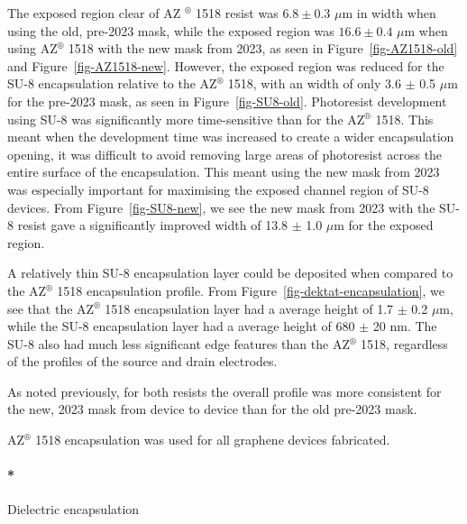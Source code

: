 \documentclass[
  letterpaper,
  DIV=11,
  numbers=noendperiod]{scrartcl}
\let\oldparagraph\paragraph
\renewcommand{\paragraph}[1]{\oldparagraph{#1}\mbox{}}
\begin{document}
The exposed region clear of AZ \(^\circledR\) 1518 resist was
\(6.8 \pm 0.3\) \(\mu\)m in width when using the old, pre-2023 mask,
while the exposed region was \(16.6 \pm 0.4\) \(\mu\)m when using
AZ\(^\circledR\) 1518 with the new mask from 2023, as seen in
Figure~\ref{fig-AZ1518-old} and Figure~\ref{fig-AZ1518-new}. However,
the exposed region was reduced for the SU-8 encapsulation relative to
the AZ\(^\circledR\) 1518, with an width of only 3.6 \(\pm\) 0.5
\(\mu\)m for the pre-2023 mask, as seen in Figure~\ref{fig-SU8-old}.
Photoresist development using SU-8 was significantly more time-sensitive
than for the AZ\(^\circledR\) 1518. This meant when the development time
was increased to create a wider encapsulation opening, it was difficult
to avoid removing large areas of photoresist across the entire surface
of the encapsulation. This meant using the new mask from 2023 was
especially important for maximising the exposed channel region of SU-8
devices. From Figure~\ref{fig-SU8-new}, we see the new mask from 2023
with the SU-8 resist gave a significantly improved width of 13.8 \(\pm\)
1.0 \(\mu\)m for the exposed region.

A relatively thin SU-8 encapsulation layer could be deposited when
compared to the AZ\(^\circledR\) 1518 encapsulation profile. From
Figure~\ref{fig-dektat-encapsulation}, we see that the AZ\(^\circledR\)
1518 encapsulation layer had a average height of 1.7 \(\pm\) 0.2
\(\mu\)m, while the SU-8 encapsulation layer had a average height of 680
\(\pm\) 20 nm. The SU-8 also had much less significant edge features
than the AZ\(^\circledR\) 1518, regardless of the profiles of the source
and drain electrodes.

As noted previously, for both resists the overall profile was more
consistent for the new, 2023 mask from device to device than for the old
pre-2023 mask.

AZ\(^\circledR\) 1518 encapsulation was used for all graphene devices
fabricated.

\hypertarget{dielectric-encapsulation}{%
\paragraph*{Dielectric encapsulation}\label{dielectric-encapsulation}}
\end{document}
